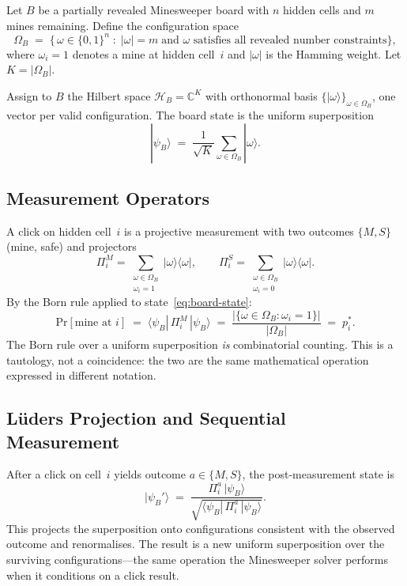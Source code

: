 \documentclass[12pt,a4paper]{article}
\theoremstyle{definition}
\theoremstyle{remark}
\newcommand{\Hil}{\mathcal{H}}
\newcommand{\Conf}{\Omega}
\newcommand{\ket}[1]{|#1\rangle}
\newcommand{\bra}[1]{\langle#1|}
\newcommand{\proj}[1]{|#1\rangle\langle#1|}
\newcommand{\C}{\mathbb{C}}
\newcommand{\Prob}{\mathrm{Pr}}
\begin{document}
Let $B$ be a partially revealed Minesweeper board with $n$ hidden cells
and $m$ mines remaining.  Define the configuration space
\[
  \Conf_B \;=\; \bigl\{\, \omega \in \{0,1\}^{n} \;:\;
    |\omega| = m \;\text{and } \omega \text{ satisfies all revealed
    number constraints}\bigr\},
\]
where $\omega_i = 1$ denotes a mine at hidden cell~$i$ and $|\omega|$
is the Hamming weight.  Let $K = |\Conf_B|$.

Assign to $B$ the Hilbert space $\Hil_B = \C^{K}$ with
orthonormal basis $\{\ket{\omega}\}_{\omega \in \Conf_B}$, one
vector per valid configuration.  The board state is the uniform
superposition
\begin{equation}\label{eq:board-state}
  \ket{\psi_B} \;=\; \frac{1}{\sqrt{K}}
    \sum_{\omega \in \Conf_B} \ket{\omega}.
\end{equation}

\subsection{Measurement Operators}

A click on hidden cell~$i$ is a projective measurement
with two outcomes $\{M, S\}$ (mine, safe) and projectors
\[
  \Pi_i^{M} = \sum_{\substack{\omega \in \Conf_B \\ \omega_i = 1}}
    \proj{\omega},
  \qquad
  \Pi_i^{S} = \sum_{\substack{\omega \in \Conf_B \\ \omega_i = 0}}
    \proj{\omega}.
\]
By the Born rule applied to state~\eqref{eq:board-state}:
\begin{equation}\label{eq:born-formal}
  \Prob[\text{mine at } i] \;=\;
    \bra{\psi_B}\,\Pi_i^{M}\,\ket{\psi_B}
    \;=\; \frac{|\{\omega \in \Conf_B : \omega_i = 1\}|}{|\Conf_B|}
    \;=\; p_i^{*}.
\end{equation}
The Born rule over a uniform superposition \emph{is} combinatorial
counting.  This is a tautology, not a coincidence: the two are
the same mathematical operation expressed in different notation.

\subsection{L\"uders Projection and Sequential Measurement}

After a click on cell~$i$ yields outcome $a \in \{M, S\}$, the
post-measurement state is
\[
  \ket{\psi_B'} \;=\;
    \frac{\Pi_i^{a}\,\ket{\psi_B}}
         {\sqrt{\bra{\psi_B}\,\Pi_i^{a}\,\ket{\psi_B}}}.
\]
This projects the superposition onto configurations consistent with
the observed outcome and renormalises.  The result is a new uniform
superposition over the surviving configurations---the same operation
the Minesweeper solver performs when it conditions on a click result.
\end{document}
